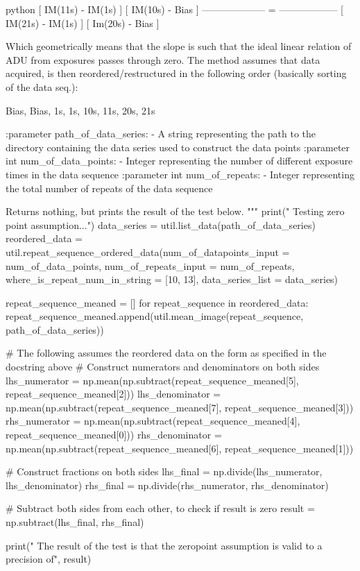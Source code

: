 \documentclass[../main.tex]{subfiles}
\begin{document}
\begin{mintedbox}{python}
[ IM(11s) - IM(1s) ]         [ IM(10s) - Bias ]
--------------------     =     ------------------
[ IM(21s) - IM(1s) ]         [ Im(20s) - Bias ]

Which geometrically means that the slope is such that the ideal linear relation of ADU
from exposures passes through zero. The method assumes that data acquired, is then
reordered/restructured in the following order (basically sorting of the data seq.):

Bias, Bias, 1s, 1s, 10s, 11s, 20s, 21s

:parameter path_of_data_series:
- A string representing the path to the directory
containing the data series used to construct the data points
:parameter int num_of_data_points:
- Integer representing the number of different exposure times
in the data sequence
:parameter int num_of_repeats:
- Integer representing the total number of repeats of the data sequence

Returns nothing, but prints the result of the test below.
"""
print(" Testing zero point assumption...")
data_series  =  util.list_data(path_of_data_series)
reordered_data  =  util.repeat_sequence_ordered_data(num_of_datapoints_input = num_of_data_points,
num_of_repeats_input = num_of_repeats,
where_is_repeat_num_in_string = [10, 13],
data_series_list = data_series)

repeat_sequence_meaned  =  []
for repeat_sequence in reordered_data:
repeat_sequence_meaned.append(util.mean_image(repeat_sequence, path_of_data_series))

# The following assumes the reordered data on the form as specified in the docstring above
# Construct numerators and denominators on both sides
lhs_numerator  =  np.mean(np.subtract(repeat_sequence_meaned[5], repeat_sequence_meaned[2]))
lhs_denominator  =  np.mean(np.subtract(repeat_sequence_meaned[7], repeat_sequence_meaned[3]))
rhs_numerator  =  np.mean(np.subtract(repeat_sequence_meaned[4], repeat_sequence_meaned[0]))
rhs_denominator  =  np.mean(np.subtract(repeat_sequence_meaned[6], repeat_sequence_meaned[1]))

# Construct fractions on both sides
lhs_final  =  np.divide(lhs_numerator, lhs_denominator)
rhs_final  =  np.divide(rhs_numerator, rhs_denominator)

# Subtract both sides from each other, to check if result is zero
result  =  np.subtract(lhs_final, rhs_final)

print("  The result of the test is that the zeropoint assumption is valid to a precision of", result)
\end{mintedbox}
\end{document}
